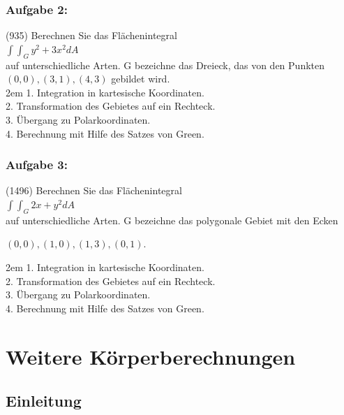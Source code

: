 \documentclass[11pt,final]{scrreprt}
\begin{document}
\subsection{Aufgabe 2:}
(935) Berechnen Sie das Flächenintegral\\

$ \int\int_G y^2+3x^2 dA $\\

auf unterschiedliche Arten. G bezeichne das Dreieck, das von den Punkten $(0, 0), (3, 1), (4, 3)$ gebildet wird.\\

\begingroup
\leftskip2em 
1. Integration in kartesische Koordinaten.\\
2. Transformation des Gebietes auf ein Rechteck.\\
3. Übergang zu Polarkoordinaten.\\
4. Berechnung mit Hilfe des Satzes von Green.\\
\par	
\endgroup

\subsection{Aufgabe 3:}
(1496) Berechnen Sie das Flächenintegral\\

$ \int\int_G 2x+y^2 dA $\\

auf unterschiedliche Arten. G bezeichne das polygonale Gebiet mit den Ecken
\begin{center}
$(0, 0), (1, 0), (1, 3), (0, 1).$
\end{center}

\begingroup
\leftskip2em 
1. Integration in kartesische Koordinaten.\\
2. Transformation des Gebietes auf ein Rechteck.\\
3. Übergang zu Polarkoordinaten.\\
4. Berechnung mit Hilfe des Satzes von Green.\\
\par	
\endgroup

\chapter{Weitere Körperberechnungen}

\section{Einleitung}
\end{document}
